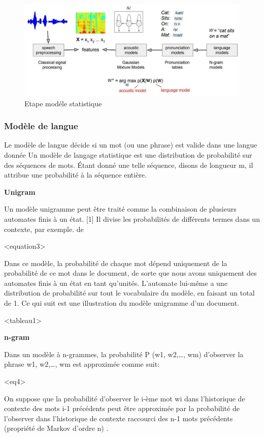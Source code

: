 \documentclass[a4paper, 12pt]{book}
\begin{document}
\begin{figure}[htbp]
  \centering
  \includegraphics[width=1\linewidth]{fig/model.png}
  \caption{Etape modéle statistique}
\end{figure}

\subsubsection{Modèle de langue}

Le modèle de langue décide si un mot (ou une phrase) est valide dans une langue donnée Un modèle de langage statistique est une distribution de probabilité sur des séquences de mots. Étant donné une telle séquence, disons de longueur m, il attribue une probabilité à la séquence entière.

\textbf{Unigram}

Un modèle unigramme peut être traité comme la combinaison de plusieurs automates finis à un état. [1] Il divise les probabilités de différents termes dans un contexte, par exemple. de

<equation3>

Dans ce modèle, la probabilité de chaque mot dépend uniquement de la probabilité de ce mot dans le document, de sorte que nous avons uniquement des automates finis à un état en tant qu'unités. L'automate lui-même a une distribution de probabilité sur tout le vocabulaire du modèle, en faisant un total de 1. Ce qui suit est une illustration du modèle unigramme d'un document.

<tableau1>

\textbf{n-gram}

Dans un modèle à n-grammes, la probabilité P (w1, w2,…, wm) d’observer la phrase w1, w2,…, wm est approximée comme suit:

<eq4>

On suppose que la probabilité d'observer le i-ème mot wi dans l'historique de contexte des mots i-1 précédents peut être approximée par la probabilité de l'observer dans l'historique de contexte raccourci des n-1 mots précédents (propriété de Markov d'ordre n) .
\end{document}

